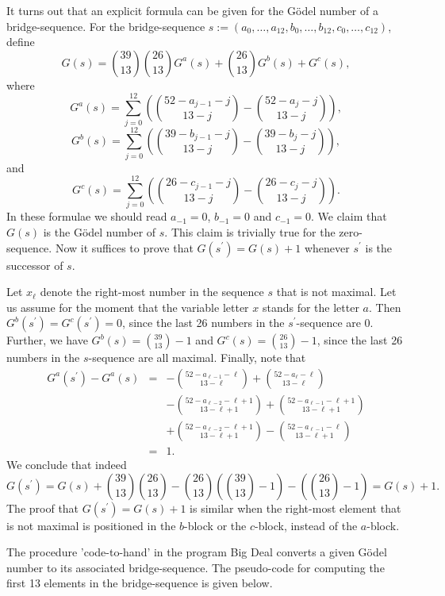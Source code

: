 It turns out that an explicit formula can be given for
the G\"odel number of a bridge-sequence. For the bridge-sequence
$s := (a_0,\ldots,a_{12},b_0,\ldots,b_{12},c_0,\ldots,c_{12})$,
define
$$ \displaystyle
G(s) =  {39 \choose 13} {26 \choose 13} G^a(s)
 +  {26 \choose 13} G^b(s)
 + G^c(s), $$
where
$$G^a(s) =
\displaystyle \sum_{j=0}^{12} ({{52-a_{j-1} - j} \choose {13-j}} - {{52-a_j-j} \choose
{13-j}}), $$
$$G^b(s) =
\displaystyle \sum_{j=0}^{12} ({{39-b_{j-1} - j} \choose {13-j}} - {{39-b_j-j} \choose
{13-j}}), $$ and
$$G^c(s) =
\displaystyle \sum_{j=0}^{12} ({{26-c_{j-1} - j} \choose {13-j}} - {{26-c_j-j} \choose
{13-j}}). $$
In these formulae we should read $a_{-1} = 0$, $b_{-1} = 0$ and $c_{-1} = 0$.
We claim that $G(s)$ is the G\"odel number of $s$. This claim is trivially true
for the zero-sequence. Now it suffices to prove that $G(s^\prime) = G(s) + 1$
whenever $s^\prime$ is the successor of $s$.

Let $x_\ell$ denote the right-most number in the sequence $s$ that is not maximal.
Let us assume for the moment that the variable letter $x$ stands for the letter
$a$. Then $G^b(s^\prime) = G^c(s^\prime) = 0$, since the last 26 numbers in the
$s^\prime$-sequence are 0. Further, we have $G^b(s) = {39\choose 13} - 1$
and $G^c(s) = {26\choose 13} - 1$, since the last 26 numbers in the
$s$-sequence are all maximal. Finally, note that
$$\begin{array}{lll}
G^a(s^\prime) - G^a(s) & = &
\displaystyle - {52-a_{\ell-1}-\ell \choose 13-\ell}
+ {52-a_\ell-\ell \choose 13-\ell} \\
& & \displaystyle - {52-a_{\ell-2}-\ell + 1 \choose 13-\ell + 1}
+ {52-a_{\ell-1}-\ell + 1 \choose 13-\ell + 1} \\
& & \displaystyle + {52-a_{\ell-2}-\ell + 1 \choose 13-\ell + 1}
- {52-a_{\ell-1}-\ell \choose 13-\ell + 1} \\
& = & 1. \end{array} $$
We conclude that indeed
$$G(s^\prime) = G(s) + {39\choose 13}{26\choose 13} - {26\choose 13}({39\choose 13} - 1)
- ({26\choose 13} - 1) = G(s) + 1.$$
The proof that $G(s^\prime) = G(s) + 1$ is similar when the right-most element
that is not maximal is positioned in the $b$-block or the $c$-block, instead
of the $a$-block.

The procedure 'code-to-hand' in the program Big Deal converts a given G\"odel
number to its associated bridge-sequence. The pseudo-code for computing the
first 13 elements in the bridge-sequence is given below. \vspace*{10mm}

